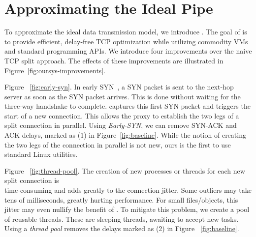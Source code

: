\section{Approximating the Ideal Pipe}\label{sec:approx}

To approximate the ideal data transmission model, we introduce \textit{\oursys}.
The goal of \oursys is to provide efficient, delay-free TCP optimization while utilizing commodity VMs and standard programming APIs. We introduce four improvements over the naive TCP split approach. The effects of these improvements are illustrated in Figure~\ref{fig:oursys-improvements}. 



 \xspace Figure ~\ref{fig:early-syn}. In early SYN~\cite{ladiwala,siracusano2016miniproxy}, a SYN packet is sent to the next-hop server as soon as the SYN packet arrives. This is done without waiting for the three-way handshake to complete. \oursys captures this first SYN packet and triggers the start of a new connection. This allows the proxy to establish the two legs of a split connection in parallel. Using \textit{Early-SYN}, we can remove SYN-ACK and ACK delays, marked as (1) in Figure~\ref{fig:baseline}.
While the notion of creating the two legs of the connection in parallel is not new, ours is the first to use standard Linux utilities.

     \xspace Figure ~\ref{fig:thread-pool}.
The creation of new processes or threads for each new split connection is \\time-consuming and adds greatly to the connection jitter. Some outliers may take tens of milliseconds, greatly hurting performance. For small files/objects, this jitter may even nullify the benefit of \oursys. To mitigate this problem, we create a pool of reusable threads. These are sleeping threads, awaiting to accept new tasks. Using a \textit{thread pool} removes the delays marked as (2) in Figure ~\ref{fig:baseline}. 

